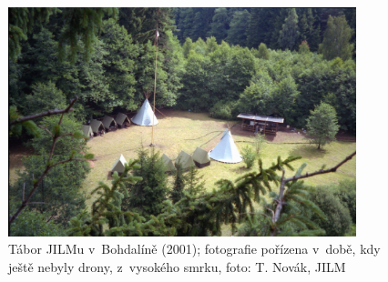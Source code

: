 \documentclass[a5paper, 11pt, twoside]{article}
\begin{document}
\begin{figure}[h]
  \centering 
  \includegraphics[width=0.9\textwidth]{img/80_bohdalin.JPG}
  \caption*{Tábor JILMu v~Bohdalíně (2001); fotografie pořízena v~době, kdy
  ještě nebyly drony, z~vysokého smrku, foto: T. Novák, JILM}
\end{figure}
\end{document}
